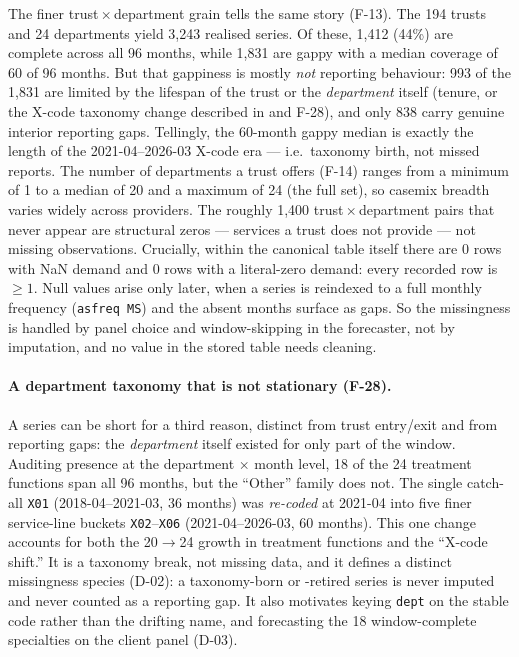\documentclass[11pt,a4paper]{article}
\begin{document}
The finer trust\,$\times$\,department grain tells the same story (F-13). The 194 trusts and 24 departments yield 3,243 realised series. Of these, 1,412 (44\%) are complete across all 96 months, while 1,831 are gappy with a median coverage of 60 of 96 months. But that gappiness is mostly \emph{not} reporting behaviour: 993 of the 1,831 are limited by the lifespan of the trust or the \emph{department} itself (tenure, or the X-code taxonomy change described in  and F-28), and only 838 carry genuine interior reporting gaps. Tellingly, the 60-month gappy median is exactly the length of the 2021-04--2026-03 X-code era --- i.e.\ taxonomy birth, not missed reports. The number of departments a trust offers (F-14) ranges from a minimum of 1 to a median of 20 and a maximum of 24 (the full set), so casemix breadth varies widely across providers. The roughly 1,400 trust\,$\times$\,department pairs that never appear are structural zeros --- services a trust does not provide --- not missing observations. Crucially, within the canonical table itself there are 0 rows with NaN demand and 0 rows with a literal-zero demand: every recorded row is $\geq 1$. Null values arise only later, when a series is reindexed to a full monthly frequency (\texttt{asfreq MS}) and the absent months surface as gaps. So the missingness is handled by panel choice and window-skipping in the forecaster, not by imputation, and no value in the stored table needs cleaning.

\paragraph{A department taxonomy that is not stationary (F-28).} A series can be short for a third reason, distinct from trust entry/exit and from reporting gaps: the \emph{department} itself existed for only part of the window. Auditing presence at the department $\times$ month level, 18 of the 24 treatment functions span all 96 months, but the ``Other'' family does not. The single catch-all \texttt{X01} (2018-04--2021-03, 36 months) was \emph{re-coded} at 2021-04 into five finer service-line buckets \texttt{X02}--\texttt{X06} (2021-04--2026-03, 60 months). This one change accounts for both the 20$\rightarrow$24 growth in treatment functions and the ``X-code shift.'' It is a taxonomy break, not missing data, and it defines a distinct missingness species (D-02): a taxonomy-born or -retired series is never imputed and never counted as a reporting gap. It also motivates keying \texttt{dept} on the stable code rather than the drifting name, and forecasting the 18 window-complete specialties on the client panel (D-03).
\end{document}
